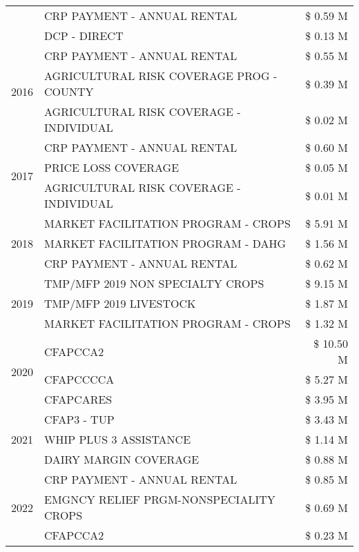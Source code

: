\begin{tabular}{llr}
 & CRP PAYMENT - ANNUAL RENTAL & \$ 0.59 M \\
 & DCP - DIRECT & \$ 0.13 M \\
\cline{1-3}
\multirow[t]{3}{*}{2016} & CRP PAYMENT - ANNUAL RENTAL & \$ 0.55 M \\
 & AGRICULTURAL RISK COVERAGE PROG - COUNTY & \$ 0.39 M \\
 & AGRICULTURAL RISK COVERAGE - INDIVIDUAL & \$ 0.02 M \\
\cline{1-3}
\multirow[t]{3}{*}{2017} & CRP PAYMENT - ANNUAL RENTAL & \$ 0.60 M \\
 & PRICE LOSS COVERAGE & \$ 0.05 M \\
 & AGRICULTURAL RISK COVERAGE - INDIVIDUAL & \$ 0.01 M \\
\cline{1-3}
\multirow[t]{3}{*}{2018} & MARKET FACILITATION PROGRAM - CROPS & \$ 5.91 M \\
 & MARKET FACILITATION PROGRAM - DAHG & \$ 1.56 M \\
 & CRP PAYMENT - ANNUAL RENTAL & \$ 0.62 M \\
\cline{1-3}
\multirow[t]{3}{*}{2019} & TMP/MFP 2019 NON SPECIALTY CROPS & \$ 9.15 M \\
 & TMP/MFP 2019 LIVESTOCK & \$ 1.87 M \\
 & MARKET FACILITATION PROGRAM - CROPS & \$ 1.32 M \\
\cline{1-3}
\multirow[t]{3}{*}{2020} & CFAPCCA2 & \$ 10.50 M \\
 & CFAPCCCCA & \$ 5.27 M \\
 & CFAPCARES & \$ 3.95 M \\
\cline{1-3}
\multirow[t]{3}{*}{2021} & CFAP3 - TUP & \$ 3.43 M \\
 & WHIP PLUS 3 ASSISTANCE & \$ 1.14 M \\
 & DAIRY MARGIN COVERAGE & \$ 0.88 M \\
\cline{1-3}
\multirow[t]{3}{*}{2022} & CRP PAYMENT - ANNUAL RENTAL & \$ 0.85 M \\
 & EMGNCY RELIEF PRGM-NONSPECIALITY CROPS & \$ 0.69 M \\
 & CFAPCCA2 & \$ 0.23 M \\
\cline{1-3}
\bottomrule
\end{tabular}
